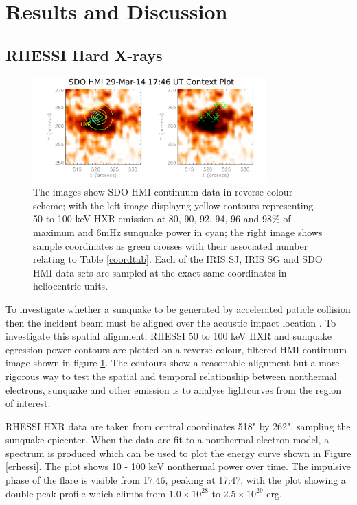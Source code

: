 \section{Results and Discussion}

\subsection{RHESSI Hard X-rays}\label{rhessiresults}
\begin{figure}[H]
  \begin{center}
  \includegraphics[width=0.8\textwidth]{29-Mar-14-HMI-Sunquake-Context-Plot}
  \end{center}
  \caption{The images show SDO HMI continuum data in reverse colour scheme; with the left image displayng yellow contours representing 50 to 100 keV HXR emission at 80, 90, 92, 94, 96 and 98$\%$ of maximum and 6mHz sunquake power in cyan; the right image shows sample coordinates as green crosses with their associated number relating to Table \ref{coordtab}. Each of the IRIS SJ, IRIS SG and SDO HMI data sets are sampled at the exact same coordinates in heliocentric units.}\label{hmicontext}
\end{figure}


To investigate whether a sunquake to be generated by accelerated paticle collision then the incident beam must be aligned over the acoustic impact location \citep{1998IAUS..185..191K}. To investigate this spatial alignment, RHESSI 50 to 100 keV HXR and sunquake egression power contours are plotted on a reverse colour, filtered HMI continuum image shown in figure \ref{hmicontext}. The contours show a reasonable alignment but a more rigorous way to test the spatial and temporal relationship between nonthermal electrons, sunquake and other emission is to analyse lightcurves from the region of interest.   %

RHESSI HXR data are taken from central coordinates 518" by 262", sampling the sunquake epicenter. When the data are fit to a nonthermal electron model, a spectrum is produced which can be used to plot the energy curve shown in Figure \ref{erhessi}. The plot shows 10 - 100 keV nonthermal power over time. The impulsive phase of the flare is visible from 17:46, peaking at 17:47, with the plot showing a double peak profile which climbs from $1.0{\times}10^{28}$ to $2.5{\times}10^{29}$ erg. 



